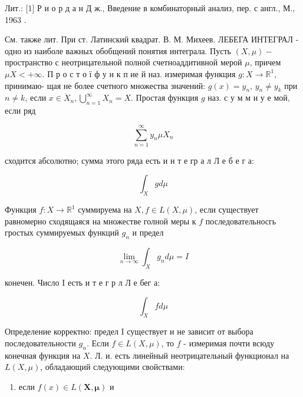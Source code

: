 \documentclass[10pt]{article}
\begin{document}
Лит.: [1] Р и о р д а н Д ж., Введение в комбинаторный анализ, пер. с англ., М., 1963 .



См. также лит. При ст. Латинский квадрат. В. М. Михеев. ЛЕБЕГА ИНТЕГРАЛ - одно из наиболе важных обобщений понятия интеграла. Пусть $(X, \mu)-$ пространство с неотрицательной полной счетноаддитивной мерой $\mu$, причем $\mu X<+\infty$. П р о с т о ї ф у н к п ие й наз. измеримая функция $g: X \rightarrow \mathbb{R}^{1}$, принимаю- щая не более счетного множества значений: $g(x)=y_{n}$, $y_{n} \neq y_{k}$ при $n \neq k$, если $x \in \dot{X}_{n}, \bigcup_{n=1}^{\infty} X_{n}=X$. Простая функция $g$ наз. с у м м и у е мой, если ряд



\[

\sum_{n=1}^{\infty} y_{n} \mu X_{n}

\]



сходится абсолютно; сумма этого ряда есть и н т е гр а л Л е б е г а:



\[

\int_{X} g d \mu

\]



Функция $f: X \rightarrow \mathbb{R}^{1}$ суммируема на $X, f \in L(X, \mu)$, если существует равномерно сходящаяся на множестве голной меры к $f$ последовательносгь гростых суммируемых функций $g_{n}$ и предел



\[

\lim _{n \rightarrow \infty} \int_{X} g_{n} d \mu=I

\]



конечен. Число I есть и т е г р л Л е бег а:



\[

\int_{X} f d \mu

\]



Определение корректно: предел I существует и не зависит от выбора последовательности $g_{n}$. Если $f \in L(X, \mu)$, то $f$ - измеримая почти всюду конечная функция на $X$. Л. и. есть линейный неотрицательный функционал на $L(X, \mu)$, обладающий следующими свойствами:



\begin{enumerate}

  \item если $f(x) \in L(\boldsymbol{X}, \boldsymbol{\mu})$ и

\end{enumerate}
\end{document}
